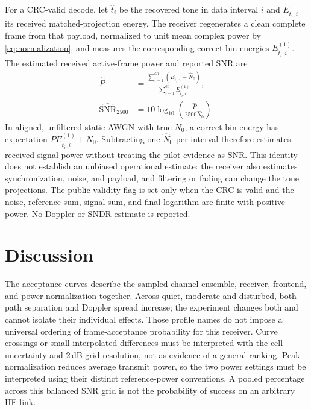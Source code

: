 \documentclass[11pt,a4paper]{article}
\newcommand{\Nzero}{\widehat{N}_0}
\begin{document}
For a CRC-valid decode, let $\widehat t_i$ be the recovered tone in data
interval $i$ and $E_{\widehat t_i,i}$ its received matched-projection energy.
The receiver regenerates a clean complete frame from that payload, normalized
to unit mean complex power by \eqref{eq:normalization}, and measures the
corresponding correct-bin energies $E^{(1)}_{\widehat t_i,i}$. The estimated
received active-frame power and reported SNR are
\begin{align}
 \widehat P &=\frac{\sum_{i=1}^{60}
   (E_{\widehat t_i,i}-\Nzero)}
   {\sum_{i=1}^{60}E^{(1)}_{\widehat t_i,i}},
   \label{eq:snrestpower}\\
 \widehat{\mathrm{SNR}}_{2500}
   &=10\log_{10}\!\left(\frac{\widehat P}{2500\Nzero}\right).
   \label{eq:snrestimate}
\end{align}
In aligned, unfiltered static AWGN with true $N_0$, a correct-bin energy has expectation
$P E^{(1)}_{\widehat t_i,i}+N_0$. Subtracting one $\Nzero$ per interval
therefore estimates received signal power without treating the pilot evidence
as SNR. This identity does not establish an unbiased operational estimate:
the receiver also estimates synchronization, noise, and payload, and filtering
or fading can change the tone projections. The public validity flag is set only when the CRC is valid and the
noise, reference sum, signal sum, and final logarithm are finite with positive
power. No Doppler or SNDR estimate is reported.




\section{Discussion}

The acceptance curves describe the sampled channel ensemble, receiver,
frontend, and power normalization together. Across quiet, moderate and
disturbed, both path separation and Doppler spread increase;
the experiment changes both and cannot isolate their individual effects.
Those profile names do not impose a universal ordering of frame-acceptance
probability for this receiver. Curve crossings or small interpolated
differences must be interpreted with the cell uncertainty and 2\,dB grid
resolution, not as evidence of a general ranking.
Peak normalization reduces average
transmit power, so the two power settings must be interpreted using their
distinct reference-power conventions. A pooled percentage across this
balanced SNR grid is not the probability of success on an arbitrary HF link.
\end{document}
